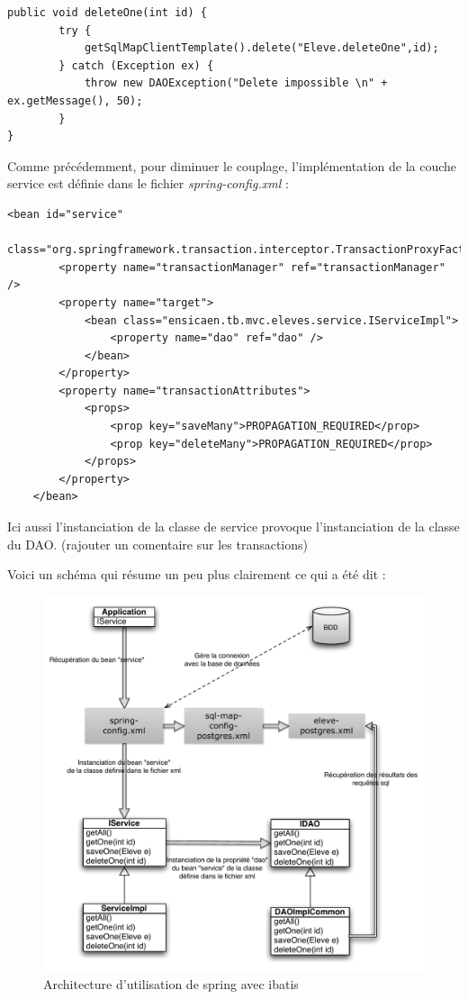 \documentclass[a4paper,12pt]{article}
\begin{document}
\begin{lstlisting}
public void deleteOne(int id) {
		try {
			getSqlMapClientTemplate().delete("Eleve.deleteOne",id);
		} catch (Exception ex) {
			throw new DAOException("Delete impossible \n" + ex.getMessage(), 50);
		}
}
\end{lstlisting}

Comme précédemment, pour diminuer le couplage, l'implémentation de la couche service est définie dans le fichier \textit{spring-config.xml} :

\begin{lstlisting}
<bean id="service"
		class="org.springframework.transaction.interceptor.TransactionProxyFactoryBean">
		<property name="transactionManager" ref="transactionManager" />
		<property name="target">
			<bean class="ensicaen.tb.mvc.eleves.service.IServiceImpl">
				<property name="dao" ref="dao" />
			</bean>
		</property>
		<property name="transactionAttributes">
			<props>
				<prop key="saveMany">PROPAGATION_REQUIRED</prop>
				<prop key="deleteMany">PROPAGATION_REQUIRED</prop>
			</props>
		</property>
	</bean>
\end{lstlisting}

Ici aussi l'instanciation de la classe de service provoque l'instanciation de la classe du DAO. (rajouter un comentaire sur les transactions)

Voici un schéma qui résume un peu plus clairement ce qui a été dit :

\begin{figure}[H]
	\center
	\includegraphics[width=15cm]{img/springibatis.pdf}
	\caption{Architecture d'utilisation de spring avec ibatis}
\end{figure}
\end{document}
